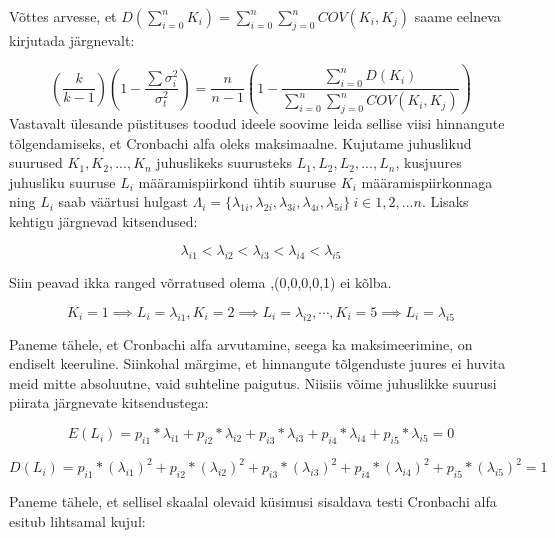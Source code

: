 \documentclass[a4paper]{article}
\numberwithin{equation}{section}
\theoremstyle{definition}
\begin{document}
Võttes arvesse, et $D(\sum \limits_{i=0}^n K_i) = \sum \limits_{i=0}^n \sum \limits_{j=0}^n COV(K_i,K_j)$ saame eelneva kirjutada järgnevalt:

\begin{equation*}
(\frac{k}{k-1})( 1 - \frac{\sum \sigma_i^2}{\sigma_t^2}) = \frac{n}{n-1}\left(1 - \frac
{\sum \limits_{i=0}^n D(K_i)}{\sum \limits_{i=0}^n \sum \limits_{j=0}^n COV(K_i,K_j)}\right)
\end{equation*}
Vastavalt \"ulesande p\"ustituses toodud ideele soovime leida sellise viisi hinnangute tõlgendamiseks, et Cronbachi alfa oleks maksimaalne. Kujutame juhuslikud suurused $K_1,K_2,...,K_n$ juhuslikeks suurusteks $L_1, L_2,L_2,...,L_n$, kusjuures juhusliku suuruse $L_i$ määramispiirkond \"uhtib suuruse $K_i$ määramispiirkonnaga ning $L_i$ saab väärtusi hulgast $\Lambda_i = \{\lambda_{1i},\lambda_{2i},\lambda_{3i},\lambda_{4i},\lambda_{5i}\} ~ i \in {1,2,...n}$. Lisaks kehtigu järgnevad kitsendused: 


\begin{equation*}
\lambda_{i1} < \lambda_{i2}  < \lambda_{i3} < \lambda_{i4} < \lambda_{i5}
\end{equation*}

{\color{cyan} Siin peavad ikka ranged võrratused olema ,(0,0,0,0,1) ei kõlba.}

\begin{equation*}
K_i = 1 \implies L_i = \lambda_{i1}, K_i = 2 \implies L_i = \lambda_{i2},\cdots, K_i = 5 \implies L_i =\lambda_{i5}
\end{equation*}

Paneme tähele, et Cronbachi alfa arvutamine, seega ka maksimeerimine, on endiselt keeruline. Siinkohal märgime, et hinnangute tõlgenduste juures ei huvita meid mitte absoluutne, vaid suhteline paigutus. Niisiis võime juhuslikke suurusi piirata järgnevate kitsendustega:


\begin{equation}
E(L_i) = p_{i1}*\lambda_{i1}+p_{i2}*\lambda_{i2}+p_{i3}*\lambda_{i3}+
p_{i4}*\lambda_{i4}+p_{i5}*\lambda_{i5}=0
\end{equation}

\begin{equation}
D(L_i) = 
p_{i1}*(\lambda_{i1})^2+ p_{i2}*(\lambda_{i2})^2 + p_{i3}*(\lambda_{i3})^2 + p_{i4}*(\lambda_{i4})^2 + p_{i5}*(\lambda_{i5})^2 = 1 
\end{equation}


Paneme tähele, et sellisel skaalal olevaid k\"usimusi sisaldava testi Cronbachi alfa esitub lihtsamal kujul:
\end{document}
